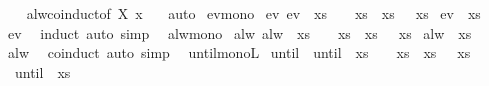 \begin{isabellebody}
%
\isadelimproof
\ \ %
\endisadelimproof
%
\isatagproof
{}\isamarkupfalse%
\ alw{\isachardot}coinduct{\isacharbrackleft}of\ X\ x\ {\isasymphi}{\isacharbrackright}\ \isamarkupfalse%
\ auto%
\endisatagproof
{\isafoldproof}%
%
\isadelimproof
\isanewline
%
\endisadelimproof
\isanewline
{}\isamarkupfalse%
\ ev{\isacharunderscore}mono{\isacharcolon}\isanewline
{}\ ev{\isacharcolon}\ {\isachardoublequoteopen}ev\ {\isasymphi}\ xs{\isachardoublequoteclose}\ \ {}{\isacharcolon}\ {\isachardoublequoteopen}{\isasymAnd}\ xs{\isachardot}\ {\isasymphi}\ xs\ {\isasymLongrightarrow}\ {\isasympsi}\ xs{\isachardoublequoteclose}\isanewline
{}\ {\isachardoublequoteopen}ev\ {\isasympsi}\ xs{\isachardoublequoteclose}\isanewline
%
\isadelimproof
%
\endisadelimproof
%
\isatagproof
{}\isamarkupfalse%
\ ev\ \isamarkupfalse%
\ induct\ {\isacharparenleft}auto\ simp{\isacharcolon}\ {}{\isacharparenright}%
\endisatagproof
{\isafoldproof}%
%
\isadelimproof
\isanewline
%
\endisadelimproof
\isanewline
{}\isamarkupfalse%
\ alw{\isacharunderscore}mono{\isacharcolon}\isanewline
{}\ alw{\isacharcolon}\ {\isachardoublequoteopen}alw\ {\isasymphi}\ xs{\isachardoublequoteclose}\ \ {}{\isacharcolon}\ {\isachardoublequoteopen}{\isasymAnd}\ xs{\isachardot}\ {\isasymphi}\ xs\ {\isasymLongrightarrow}\ {\isasympsi}\ xs{\isachardoublequoteclose}\isanewline
{}\ {\isachardoublequoteopen}alw\ {\isasympsi}\ xs{\isachardoublequoteclose}\isanewline
%
\isadelimproof
%
\endisadelimproof
%
\isatagproof
{}\isamarkupfalse%
\ alw\ \isamarkupfalse%
\ coinduct\ {\isacharparenleft}auto\ simp{\isacharcolon}\ {}{\isacharparenright}%
\endisatagproof
{\isafoldproof}%
%
\isadelimproof
\isanewline
%
\endisadelimproof
\isanewline
{}\isamarkupfalse%
\ until{\isacharunderscore}monoL{\isacharcolon}\isanewline
{}\ until{\isacharcolon}\ {\isachardoublequoteopen}{\isacharparenleft}{\isasymphi}{}\ until\ {\isasympsi}{\isacharparenright}\ xs{\isachardoublequoteclose}\ \ {}{\isacharcolon}\ {\isachardoublequoteopen}{\isasymAnd}\ xs{\isachardot}\ {\isasymphi}{}\ xs\ {\isasymLongrightarrow}\ {\isasymphi}{}\ xs{\isachardoublequoteclose}\isanewline
{}\ {\isachardoublequoteopen}{\isacharparenleft}{\isasymphi}{}\ until\ {\isasympsi}{\isacharparenright}\ xs{\isachardoublequoteclose}\isanewline

\end{isabellebody}
